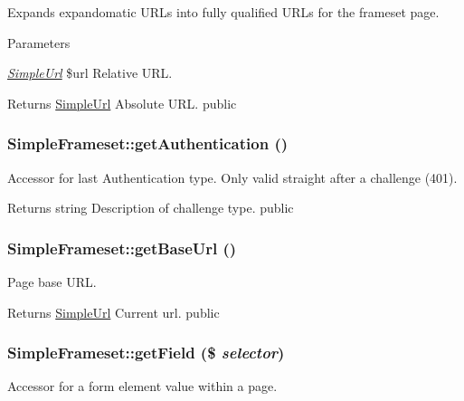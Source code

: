 Expands expandomatic URLs into fully qualified URLs for the frameset page. 
\begin{DoxyParams}{Parameters}
\item[{\em \hyperlink{class_simple_url}{SimpleUrl}}]\$url Relative URL. \end{DoxyParams}
\begin{DoxyReturn}{Returns}
\hyperlink{class_simple_url}{SimpleUrl} Absolute URL.  public 
\end{DoxyReturn}
\hypertarget{class_simple_frameset_ac62ad599b9e34170dfc53e52cdbd18f8}{
\subsubsection[{getAuthentication}]{\setlength{\rightskip}{0pt plus 5cm}SimpleFrameset::getAuthentication ()}}
\label{class_simple_frameset_ac62ad599b9e34170dfc53e52cdbd18f8}
Accessor for last Authentication type. Only valid straight after a challenge (401). \begin{DoxyReturn}{Returns}
string Description of challenge type.  public 
\end{DoxyReturn}
\hypertarget{class_simple_frameset_aa671398cb10ca0051d099e088131638c}{
\subsubsection[{getBaseUrl}]{\setlength{\rightskip}{0pt plus 5cm}SimpleFrameset::getBaseUrl ()}}
\label{class_simple_frameset_aa671398cb10ca0051d099e088131638c}
Page base URL. \begin{DoxyReturn}{Returns}
\hyperlink{class_simple_url}{SimpleUrl} Current url.  public 
\end{DoxyReturn}
\hypertarget{class_simple_frameset_aa8458cd2411765e664c3c693cbfd8588}{
\subsubsection[{getField}]{\setlength{\rightskip}{0pt plus 5cm}SimpleFrameset::getField (\$ {\em selector})}}
\label{class_simple_frameset_aa8458cd2411765e664c3c693cbfd8588}
Accessor for a form element value within a page. 
